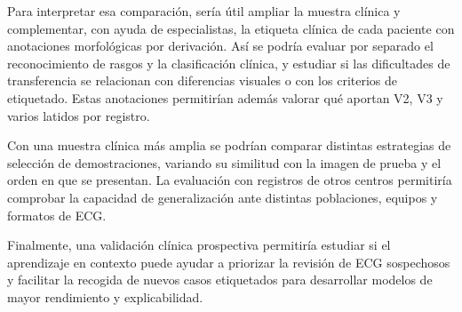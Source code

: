 Para interpretar esa comparación, sería útil ampliar la muestra clínica y complementar, con ayuda de especialistas, la etiqueta clínica de cada paciente con anotaciones morfológicas por derivación. Así se podría evaluar por separado el reconocimiento de rasgos y la clasificación clínica, y estudiar si las dificultades de transferencia se relacionan con diferencias visuales o con los criterios de etiquetado. Estas anotaciones permitirían además valorar qué aportan V2, V3 y varios latidos por registro.

Con una muestra clínica más amplia se podrían comparar distintas estrategias de selección de demostraciones, variando su similitud con la imagen de prueba y el orden en que se presentan. La evaluación con registros de otros centros permitiría comprobar la capacidad de generalización ante distintas poblaciones, equipos y formatos de ECG.

Finalmente, una validación clínica prospectiva permitiría estudiar si el aprendizaje en contexto puede ayudar a priorizar la revisión de ECG sospechosos y facilitar la recogida de nuevos casos etiquetados para desarrollar modelos de mayor rendimiento y explicabilidad.
